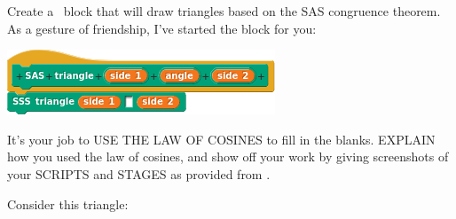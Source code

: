 \documentclass[noauthor,nooutcomes,12pt]{ximera}
\begin{document}
\begin{question}
  Create a \snap\ block that will draw triangles based on the SAS
  congruence theorem.  As a gesture of friendship, I've started the
  block for you:
  \begin{center}
    \includegraphics{sasBlockBLANK}
  \end{center}
  It's your job to USE THE LAW OF COSINES to fill in the
  blanks. EXPLAIN how you used the law of cosines, and show off your
  work by giving screenshots of your SCRIPTS and STAGES as provided
  from \snap.
  \begin{freeResponse}
    Consider this triangle:
    \begin{center}
\end{center}
\end{freeResponse}
\end{question}
\end{document}
